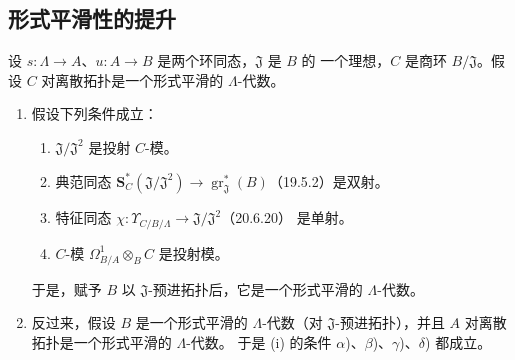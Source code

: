
\subsection{形式平滑性的提升}
\label{subsection:0.22.1-fr}

\begin{theorem}[22.1.1]
\label{0.22.1.1-fr}
设 $s:\Lambda\to A$、$u:A\to B$ 是两个环同态，$\mathfrak J$ 是 $B$ 的
一个理想，$C$ 是商环 $B/\mathfrak J$。假设 $C$ 对离散拓扑是一个形式平滑的
$\Lambda$-代数。
\begin{enumerate}
  \item[(i)] 假设下列条件成立：
  \begin{enumerate}
    \item[$\alpha$)] $\mathfrak J/\mathfrak J^2$ 是投射 $C$-模。
    \item[$\beta$)] 典范同态
    $\mathbf S_C^*(\mathfrak J/\mathfrak J^2)\to
    \operatorname{gr}_{\mathfrak J}^*(B)$（19.5.2）是双射。
    \item[$\gamma$)] 特征同态
    $\chi:\Upsilon_{C/B/\Lambda}\to\mathfrak J/\mathfrak J^2$（20.6.20）
    是单射。
    \item[$\delta$)] $C$-模
    $\Omega^1_{B/A}\otimes_BC$ 是投射模。
  \end{enumerate}
  于是，赋予 $B$ 以 $\mathfrak J$-预进拓扑后，它是一个形式平滑的
  $\Lambda$-代数。

  \item[(ii)] 反过来，假设 $B$ 是一个形式平滑的 $\Lambda$-代数（对
  $\mathfrak J$-预进拓扑），并且 $A$ 对离散拓扑是一个形式平滑的
  $\Lambda$-代数。
  于是 (i) 的条件 $\alpha$)、$\beta$)、$\gamma$)、$\delta$) 都成立。
\end{enumerate}
\end{theorem}

